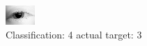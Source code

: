 \begin{figure}[h!]
\begin{center}
\includegraphics[width=0.60\columnwidth]{figures/ID3_class_4_target_3.png}
\end{center}
\caption{ Classification: 4 actual target: 3}
\label{fig:ID3_class_4_target_3}
\end{figure}
